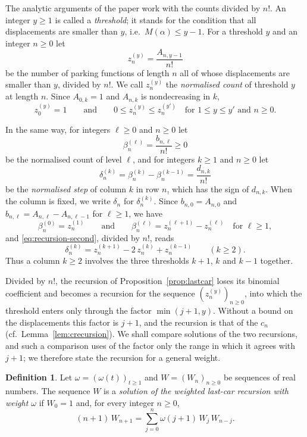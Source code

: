 \documentclass{amsart}
\theoremstyle{definition}
\newtheorem{definition}[theorem]{Definition}
\theoremstyle{remark}
\numberwithin{equation}{section}
\begin{document}
The analytic arguments of the paper work with the counts divided by $n!$. An integer $y\ge 1$ is called a \emph{threshold}; it stands for the condition that all displacements are smaller than $y$, i.e.\ $M(\alpha)\le y-1$. For a threshold $y$ and an integer $n\ge 0$ let
\[
z^{(y)}_n=\frac{A_{n,y-1}}{n!}
\]
be the number of parking functions of length $n$ all of whose displacements are smaller than $y$, divided by $n!$. We call $z^{(y)}_n$ the \emph{normalised count} of threshold $y$ at length $n$. Since $A_{0,k}=1$ and $A_{n,k}$ is nondecreasing in $k$,
\begin{equation}\label{eq:recursion-monotone}
z^{(y)}_0=1\qquad\text{and}\qquad 0\le z^{(y)}_n\le z^{(y')}_n\quad\text{for } 1\le y\le y' \text{ and } n\ge 0.
\end{equation}

In the same way, for integers $\ell\ge 0$ and $n\ge 0$ let
\[
\beta^{(\ell)}_n=\frac{b_{n,\ell}}{n!}\ge 0
\]
be the normalised count of level $\ell$, and for integers $k\ge 1$ and $n\ge 0$ let
\[
\delta^{(k)}_n=\beta^{(k)}_n-\beta^{(k-1)}_n=\frac{d_{n,k}}{n!}
\]
be the \emph{normalised step} of column $k$ in row $n$, which has the sign of $d_{n,k}$. When the column is fixed, we write $\delta_n$ for $\delta^{(k)}_n$. Since $b_{n,0}=A_{n,0}$ and $b_{n,\ell}=A_{n,\ell}-A_{n,\ell-1}$ for $\ell\ge 1$, we have
\begin{equation}\label{eq:recursion-levels}
\beta^{(0)}_n=z^{(1)}_n\qquad\text{and}\qquad\beta^{(\ell)}_n=z^{(\ell+1)}_n-z^{(\ell)}_n\quad\text{for }\ell\ge 1,
\end{equation}
and \eqref{eq:recursion-second}, divided by $n!$, reads
\[
\delta^{(k)}_n=z^{(k+1)}_n-2\,z^{(k)}_n+z^{(k-1)}_n\qquad(k\ge 2).
\]
Thus a column $k\ge 2$ involves the three thresholds $k+1$, $k$ and $k-1$ together.

Divided by $n!$, the recursion of Proposition~\ref{prop:lastcar} loses its binomial coefficient and becomes a recursion for the sequence $(z^{(y)}_n)_{n\ge 0}$, into which the threshold enters only through the factor $\min(j+1,y)$. Without a bound on the displacements this factor is $j+1$, and the recursion is that of the $c_n$ (cf.\ Lemma~\ref{lem:crecursion}). We shall compare solutions of the two recursions, and such a comparison uses of the factor only the range in which it agrees with $j+1$; we therefore state the recursion for a general weight.

\begin{definition}\label{def:weighted}
Let $\omega=(\omega(t))_{t\ge 1}$ and $W=(W_n)_{n\ge 0}$ be sequences of real numbers. The sequence $W$ is a \emph{solution of the weighted last-car recursion with weight $\omega$} if $W_0=1$ and, for every integer $n\ge 0$,
\[
(n+1)\,W_{n+1}=\sum_{j=0}^{n}\omega(j+1)\,W_j\,W_{n-j}.
\]
\end{definition}
\end{document}
